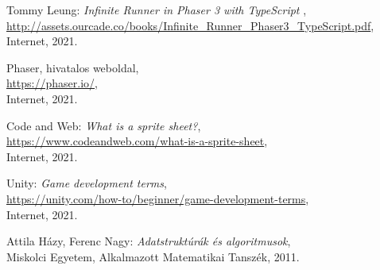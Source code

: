 \begin{thebibliography}{x}
	Tommy Leung: \emph{Infinite Runner in Phaser 3 with	TypeScript
}, \\
	\url{http://assets.ourcade.co/books/Infinite_Runner_Phaser3_TypeScript.pdf},
	Internet, 2021.
	
	Phaser, hivatalos weboldal, \\
	\url{https://phaser.io/}, \\
	Internet, 2021.
	
	Code and Web: \emph{What is a sprite sheet?}, \\
	\url{https://www.codeandweb.com/what-is-a-sprite-sheet}, \\
	Internet, 2021.
	
	Unity: \emph{Game development terms}, \\
	\url{https://unity.com/how-to/beginner/game-development-terms}, \\
	Internet, 2021.
	
	Attila Házy, Ferenc Nagy: \emph{Adatstruktúrák és algoritmusok}, \\
	Miskolci Egyetem, Alkalmazott Matematikai Tanszék, 2011.

\end{thebibliography}
